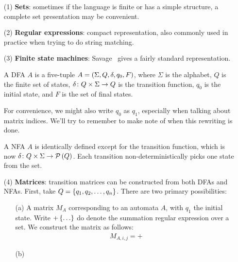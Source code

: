 \begin{enumerate}
  \item[(1)]
    \textbf{Sets}:
    sometimes if the language is finite or has a simple structure,
    a complete set presentation may be convenient.

  \item[(2)]
    \textbf{Regular expressions}:
    compact representation,
    also commonly used in practice when trying to do string matching.

  \item[(3)]
    \textbf{Finite state machines}:
    Savage~\cite{savage1998models} gives a fairly standard representation.

    \begin{definition}[DFA]
      A DFA \(A\) is a five-tuple \(A = \left(\Sigma, Q, \delta, q_0, F\right)\),
      where \(\Sigma\) is the alphabet, \(Q\) is the finite set of states,
      \(\delta \colon Q \times \Sigma \to Q\) is the transition function,
      \(q_0\) is the initial state, and \(F\) is the set of final states.
    \end{definition}

    For convenience, we might also write \(q_0\) as \(q_1\),
    especially when talking about matrix indices.
    We'll try to remember to make note of when this rewriting is done.

    \begin{definition}[NFA]
      A NFA \(A\) is identically defined except for the
      transition function, which is now
      \(\delta \colon Q \times \Sigma \to \mathcal{P}\left(Q\right)\).
      Each transition non-deterministically picks one state from the set.
    \end{definition}

  \item[(4)]
    \textbf{Matrices}:
    transition matrices can be constructed from both DFAs and NFAs.
    First, take \(Q = \left\{q_1, q_2, \ldots, q_n\right\}\).
    There are two primary possibilities:

    \begin{enumerate}
      \item[(a)]
        A matrix \(M_A\) corresponding to an automata \(A\),
        with \(q_1\) the initial state.
        Write \(+\left\{\ldots\right\}\) do denote
        the summation regular expression over a set.
        We construct the matrix as follows:
        \begin{align*}
          M_{A, i, j} =
            + 
        \end{align*}


      \item[(b)]
    \end{enumerate}

\end{enumerate}



